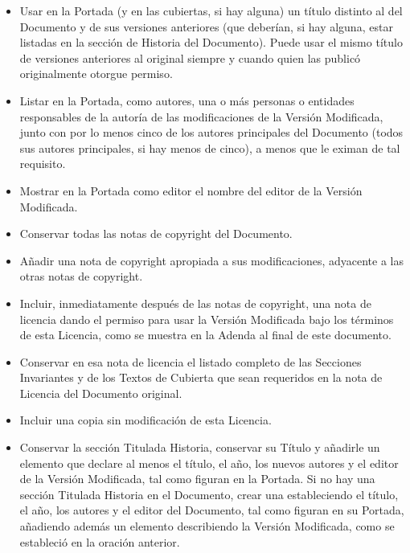 \begin{itemize}

\item Usar en la Portada (y en las cubiertas, si hay alguna) un
título distinto al del Documento y de sus versiones anteriores
(que deberían, si hay alguna, estar listadas en la sección de
Historia del Documento). Puede usar el mismo título de versiones
anteriores al original siempre y cuando quien las publicó
originalmente otorgue permiso.

\item Listar en la Portada, como autores, una o más personas o
entidades responsables de la autoría de las modificaciones de la
Versión Modificada, junto con por lo menos cinco de los autores
principales del Documento (todos sus autores principales, si hay
menos de cinco), a menos que le eximan de tal requisito.

\item Mostrar en la Portada como editor el nombre del editor de la
Versión Modificada.

\item Conservar todas las notas de copyright del Documento.

\item Añadir una nota de copyright apropiada a sus modificaciones,
adyacente a las otras notas de copyright.

\item Incluir, inmediatamente después de las notas de copyright, una
nota de licencia dando el permiso para usar la Versión Modificada
bajo los términos de esta Licencia, como se muestra en la Adenda
al final de este documento.

\item Conservar en esa nota de licencia el listado completo de las
Secciones Invariantes y de los Textos de Cubierta que sean
requeridos en la nota de Licencia del Documento original.

\item Incluir una copia sin modificación de esta Licencia.

\item Conservar la sección Titulada Historia, conservar su Título y
añadirle un elemento que declare al menos el título, el año, los
nuevos autores y el editor de la Versión Modificada, tal como
figuran en la Portada. Si no hay una sección Titulada Historia en
el Documento, crear una estableciendo el título, el año, los
autores y el editor del Documento, tal como figuran en su Portada,
añadiendo además un elemento describiendo la Versión Modificada,
como se estableció en la oración anterior.


\end{itemize}
